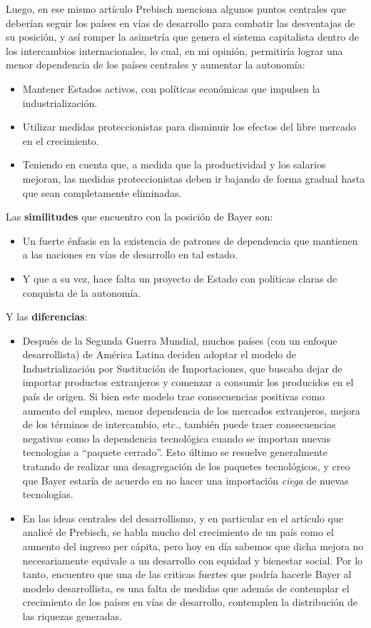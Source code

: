 Luego, en ese mismo artículo Prebisch menciona algunos puntos centrales que deberían seguir los países en vías de desarrollo para combatir las desventajas de su posición, y así romper la asimetría que genera el sistema capitalista dentro de los intercambios internacionales, lo cual, en mi opinión, permitiría lograr una menor dependencia de los países centrales y aumentar la autonomía:

 \begin{itemize}
     \item Mantener Estados activos, con políticas económicas que impulsen la industrialización.
     \item Utilizar medidas proteccionistas para disminuir los efectos del libre mercado en el crecimiento.
     \item Teniendo en cuenta que, a medida que la productividad y los salarios mejoran, las medidas proteccionistas deben ir bajando de forma gradual hasta que sean completamente eliminadas.
 \end{itemize}

 Las \textbf{similitudes} que encuentro con la posición de Bayer son:

 \begin{itemize}
     \item Un fuerte énfasis en la existencia de patrones de dependencia que mantienen a las naciones en vías de desarrollo en tal estado.
     \item Y que a su vez, hace falta un proyecto de Estado con políticas claras de conquista de la autonomía.
 \end{itemize}

 Y las \textbf{diferencias}:

 \begin{itemize}
     \item Después de la Segunda Guerra Mundial, muchos países (con un enfoque desarrollista) de América Latina deciden adoptar el modelo de Industrialización por Sustitución de Importaciones, que buscaba dejar de importar productos extranjeros y comenzar a consumir los producidos en el país de origen. Si bien este modelo trae consecuencias positivas como aumento del empleo, menor dependencia de los mercados extranjeros, mejora de los términos de intercambio, etc., también puede traer consecuencias negativas como la dependencia tecnológica cuando se importan nuevas tecnologías a ``paquete cerrado''. Esto último se resuelve generalmente tratando de realizar una desagregación de los paquetes tecnológicos, y creo que Bayer estaría de acuerdo en no hacer una importación \textit{ciega} de nuevas tecnologías.
     \item En las ideas centrales del desarrollismo, y en particular en el artículo que analicé de Prebisch, se habla mucho del crecimiento de un país como el aumento del ingreso per cápita, pero hoy en día sabemos que dicha mejora no necesariamente equivale a un desarrollo con equidad y bienestar social. Por lo tanto, encuentro que una de las criticas fuertes que podría hacerle Bayer al modelo desarrollista, es una falta de medidas que además de contemplar el crecimiento de los países en vías de desarrollo, contemplen la distribución de las riquezas generadas.
 \end{itemize}
